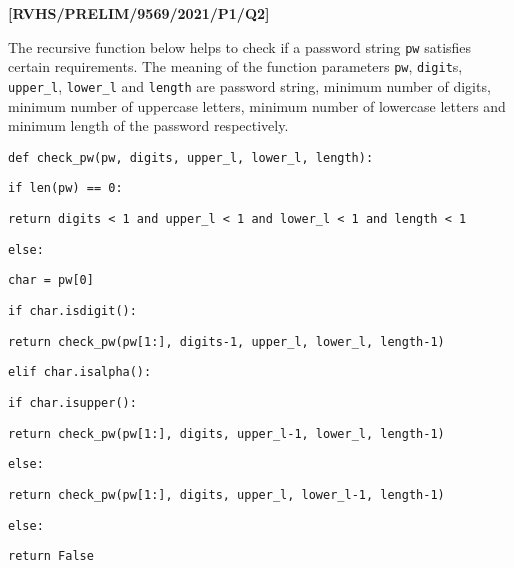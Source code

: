 \item \textbf{{[}RVHS/PRELIM/9569/2021/P1/Q2{]} }

The recursive function below helps to check if a password string \texttt{pw}
satisfies certain requirements. The meaning of the function parameters
\texttt{pw}, \texttt{digit}s, \texttt{upper\_l}, \texttt{lower\_l}
and \texttt{length} are password string, minimum number of digits,
minimum number of uppercase letters, minimum number of lowercase letters
and minimum length of the password respectively.

\noindent\begin{minipage}[t]{1\columnwidth}%
\texttt{def check\_pw(pw, digits, upper\_l, lower\_l, length): }

\texttt{\qquad{}if len(pw) == 0: }

\texttt{\qquad{}\qquad{}return digits < 1 and upper\_l < 1 and lower\_l
< 1 and length < 1 }

\texttt{\qquad{}else: }

\texttt{\qquad{}\qquad{}char = pw{[}0{]} }

\texttt{\qquad{}\qquad{}if char.isdigit(): }

\texttt{\qquad{}\qquad{}\qquad{}return check\_pw(pw{[}1:{]}, digits-1,
upper\_l, lower\_l, length-1) }

\texttt{\qquad{}\qquad{}elif char.isalpha(): }

\texttt{\qquad{}\qquad{}\qquad{}if char.isupper():}

\texttt{\qquad{}\qquad{}\qquad{}\qquad{}return check\_pw(pw{[}1:{]},
digits, upper\_l-1, lower\_l, length-1) }

\texttt{\qquad{}\qquad{}\qquad{}else: }

\texttt{\qquad{}\qquad{}\qquad{}\qquad{}return check\_pw(pw{[}1:{]},
digits, upper\_l, lower\_l-1, length-1) }

\texttt{\qquad{}\qquad{}\qquad{}else: }

\texttt{\qquad{}\qquad{}\qquad{}\qquad{}return False }%
\end{minipage}
